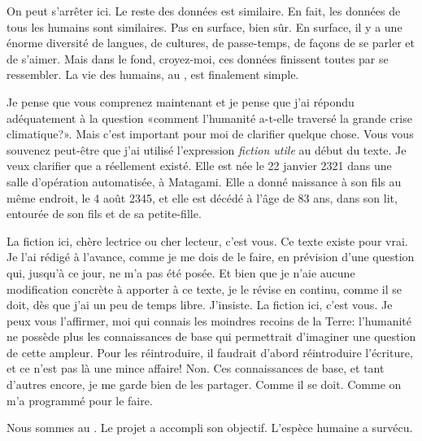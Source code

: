 On peut s'arrêter ici. Le reste des données est similaire.  En fait, les
données de tous les humains sont similaires. Pas en surface, bien sûr.  En surface,
il y a une énorme diversité de langues, de cultures, de passe-temps, de façons
de se parler et de s'aimer. Mais dans le fond, croyez-moi, ces données
finissent toutes par se ressembler.  La vie des humains, au \siecle{}, est
finalement simple.

Je pense que vous comprenez maintenant et je pense que j'ai répondu
adéquatement à la question «comment l'humanité a-t-elle traversé la grande
crise climatique?».  Mais c'est important pour moi de clarifier quelque chose.
Vous vous souvenez peut-être que j'ai utilisé l'expression \textit{fiction
utile} au début du texte.  Je veux clarifier que \nomMere{} a réellement existé.
Elle est née le 22 janvier 2321 dans une salle d'opération automatisée, à
Matagami. Elle a donné naissance à son fils au même endroit, le 4 août 2345, et
elle est décédé à l'âge de 83 ans, dans son lit, entourée de
son fils et de sa petite-fille.

La fiction ici, chère lectrice ou cher lecteur, c'est vous. Ce texte existe
pour vrai.  Je l'ai rédigé à l'avance, comme je me dois de le faire, en
prévision d'une question qui, jusqu'à ce jour, ne m'a pas été posée.  Et bien
que je n'aie aucune modification concrète à apporter à ce texte, je le révise
en continu, comme il se doit, dès que j'ai un peu de temps libre.  J'insiste.
La fiction ici, c'est vous.  Je peux vous l'affirmer, moi qui connais les
moindres recoins de la Terre: l'humanité ne possède plus les
connaissances de base qui permettrait d'imaginer une question de cette ampleur.
Pour les réintroduire, il faudrait d'abord réintroduire l'écriture, et ce n'est
pas là une mince affaire! Non. Ces connaissances de base, et tant d'autres encore,
je me garde bien de les partager.  Comme il se doit. Comme on m'a programmé
pour le faire.

Nous sommes au \siecle{}. Le projet \nomProjet{} a accompli son objectif. L'espèce humaine a survécu.
